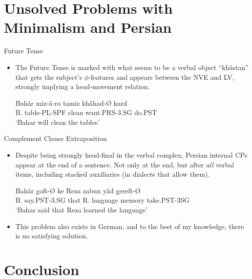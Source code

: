 \documentclass[10pt]{beamer}
\begin{document}
\section{Unsolved Problems with Minimalism and Persian}

\begin{frame}[fragile]{Future Tense}
  \begin{itemize}[<+->]
    \item The Future Tense is marked with what seems to be a verbal object ``khâstan'' that gets the subject's $\phi$-features and appears between the NVE and LV, strongly implying a head-movement relation.
      \begin{exe}
        \ex
        \gll Bahâr miz-â-ro tamiz khâhad-Ø kard\\
        B. table-PL-SPF clean want.PRS-3.SG do.PST\\
        \trans `Bahar will clean the tables'
      \end{exe}
  \end{itemize}
\end{frame}

\begin{frame}[fragile]{Complement Clause Extraposition}
    
  \begin{itemize}[<+->]
    \item Despite being strongly head-final in the verbal complex, Persian internal CPs appear at the end of a sentence. Not only at the end, but after \emph{all} verbal items, including stacked auxiliaries (in dialects that allow them). 
      \begin{exe}
        \ex
        \gll Bahâr goft-Ø ke Reza zabun yâd gereft-Ø\\
        B. say.PST-3.SG that R. language memory take.PST-3SG\\
        \trans `Bahar said that Reza learned the language'
      \end{exe}
    \item This problem also exists in German, and to the best of my knowledge, there is no satisfying solution. 
  \end{itemize}

  
  
\end{frame}



\section{Conclusion}
\end{document}
